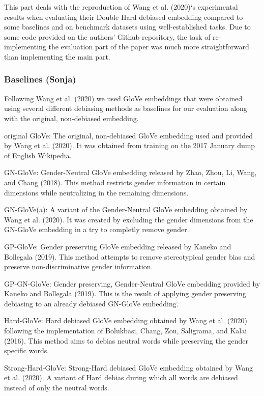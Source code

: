 \documentclass[
  english,
  man,floatsintext]{apa6}
\begin{document}
This part deals with the reproduction of Wang et al. (2020)`s experimental results when evaluating their Double Hard debiased embedding compared to some baselines and on benchmark datasets using well-established tasks. Due to some code provided on the authors' Github repository, the task of re-implementing the evaluation part of the paper was much more straightforward than implementing the main part.

\hypertarget{baselines-sonja}{%
\subsubsection{Baselines (Sonja)}\label{baselines-sonja}}

Following Wang et al. (2020) we used GloVe embeddings that were obtained using several different debiasing methods as baselines for our evaluation along with the original, non-debiased embedding.

original GloVe: The original, non-debiased GloVe embedding used and provided by Wang et al. (2020). It was obtained from training on the 2017 January dump of English Wikipedia.

GN-GloVe: Gender-Neutral GloVe embedding released by Zhao, Zhou, Li, Wang, and Chang (2018). This method restricts gender information in certain dimensions while neutralizing in the remaining dimensions.

GN-GloVe(a): A variant of the Gender-Neutral GloVe embedding obtained by Wang et al. (2020). It was created by excluding the gender dimensions from the GN-GloVe embedding in a try to completly remove gender.

GP-GloVe: Gender preserving GloVe embedding released by Kaneko and Bollegala (2019). This method attempts to remove stereotypical gender bias and preserve non-discriminative gender information.

GP-GN-GloVe: Gender preserving, Gender-Neutral GloVe embedding provided by Kaneko and Bollegala (2019). This is the result of applying gender preserving debiasing to an already debiased GN-GloVe embedding.

Hard-GloVe: Hard debiased GloVe embedding obtained by Wang et al. (2020) following the implementation of Bolukbasi, Chang, Zou, Saligrama, and Kalai (2016). This method aims to debias neutral words while preserving the gender specific words.

Strong-Hard-GloVe: Strong-Hard debiased GloVe embedding obtained by Wang et al. (2020). A variant of Hard debias during which all words are debiased instead of only the neutral words.
\end{document}
